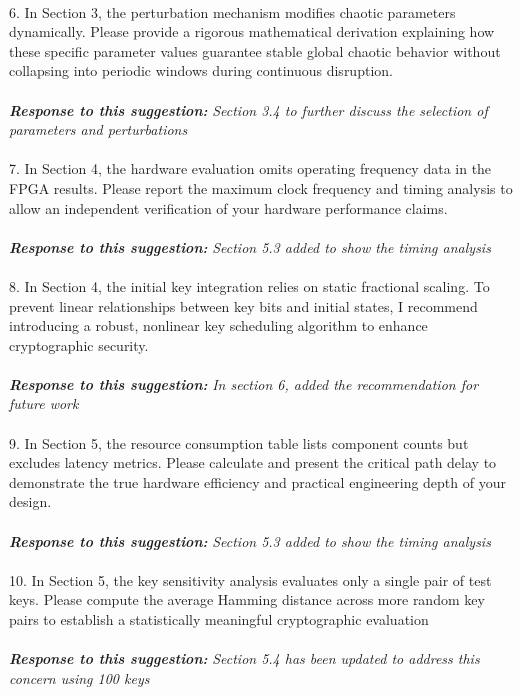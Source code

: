 \documentclass{report}
\begin{document}
\\
6. In Section 3, the perturbation mechanism modifies chaotic parameters dynamically.
Please provide a rigorous mathematical derivation explaining how these specific
parameter values guarantee stable global chaotic behavior without collapsing into
periodic windows during continuous disruption.
\\
\\
\textbf{\textit{Response to this suggestion:}}
\textit{Section 3.4 to further discuss the selection of parameters and perturbations}
\\
\\
7. In Section 4, the hardware evaluation omits operating frequency data in the FPGA
results. Please report the maximum clock frequency and timing analysis to allow an
independent verification of your hardware performance claims.
\\
\\
\textbf{\textit{Response to this suggestion:}}
\textit{Section 5.3 added to show the timing analysis}
\\
\\
8. In Section 4, the initial key integration relies on static fractional scaling. To prevent
linear relationships between key bits and initial states, I recommend introducing a robust,
nonlinear key scheduling algorithm to enhance cryptographic security.
\\
\\
\textbf{\textit{Response to this suggestion:}}
\textit{In section 6, added the recommendation for future work}
\\
\\
9.  In Section 5, the resource consumption table lists component counts but excludes
latency metrics. Please calculate and present the critical path delay to demonstrate the
true hardware efficiency and practical engineering depth of your design.
\\
\\
\textbf{\textit{Response to this suggestion:}}
\textit{Section 5.3 added to show the timing analysis}
\\
\\
10. In Section 5, the key sensitivity analysis evaluates only a single pair of test keys.
Please compute the average Hamming distance across more random key pairs to establish
a statistically meaningful cryptographic evaluation
\\
\\
\textbf{\textit{Response to this suggestion:}}
\textit{Section 5.4 has been updated to address this concern using 100 keys}
\end{document}
